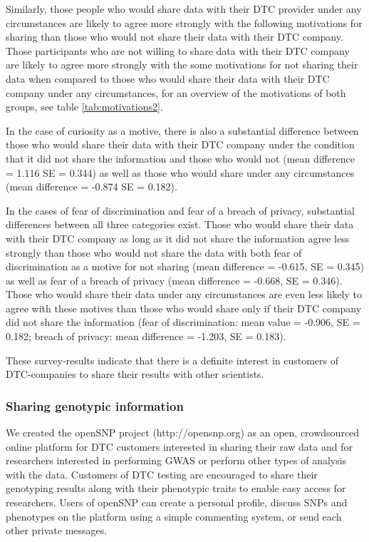\documentclass[10pt]{article}
\begin{document}
Similarly, those people who would share data with their DTC provider under any circumstances are likely to agree more strongly with 
the following motivations for sharing than those who would not share their data with their DTC company.
Those participants who are not willing to share data with their DTC company are likely to agree more strongly with the some motivations 
for not sharing their data when compared to those who would share their data with their DTC company under any circumstances, for an overview of the motivations of both groups, see table \ref{tab:motivations2}.

In the case of curiosity as a motive, there is also a substantial difference between those who would share their data with their DTC company under the condition that it did not share the information and those who would not (mean difference = 1.116 SE = 0.344) as well as those who would share under any circumstances (mean difference = -0.874 SE = 0.182).

In the cases of fear of discrimination and fear of a breach of privacy, substantial differences between all three categories exist. Those who would share their data with their DTC company as long as it did not share the information agree less strongly than those who would not share the data with both fear of discrimination as a motive for not sharing (mean difference = -0.615, SE = 0.345) as well as fear of a breach of privacy (mean difference = -0.668, SE = 0.346). Those who would share their data under any circumstances are even less likely to agree with these motives than those who would share only if their DTC company did not share the information (fear of discrimination: mean value = -0.906, SE = 0.182; breach of privacy: mean difference = -1.203, SE = 0.183).

These survey-results indicate that there is a definite interest in customers of DTC-companies to share their results with other scientists. 

\subsubsection*{Sharing genotypic information}

We created the openSNP project (http://opensnp.org) as an open, crowdsourced online platform for DTC customers interested in sharing their raw data and for researchers interested in performing GWAS or perform other types of analysis with the data. 
Customers of DTC testing are encouraged to share their genotyping results along with their phenotypic traits to enable easy access for researchers.
Users of openSNP can create a personal profile, discuss SNPs and phenotypes on the platform using a simple commenting system, or send each other private messages.
\end{document}
